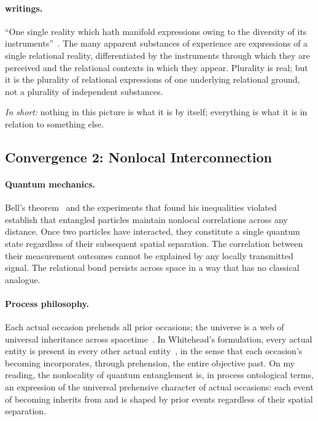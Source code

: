 \paragraph{\bahai writings.}
``One single reality which hath manifold expressions owing to the diversity of its
instruments''~\citep[para.~35]{SummonsLordHosts}.
The many apparent substances of experience are expressions of a single
relational reality, differentiated by the instruments through which they
are perceived and the relational contexts in which they appear.
Plurality is real; but it is the plurality of relational expressions of
one underlying relational ground, not a plurality of independent substances.

\emph{In short:} nothing in this picture is what it is by itself; everything
is what it is in relation to something else.

\subsection{Convergence 2: Nonlocal Interconnection}

\paragraph{Quantum mechanics.}
Bell's theorem~\citeyearpar{Bell1964} and the experiments that found his
inequalities violated~\citep{Aspect1982,Hensen2015} establish that entangled
particles maintain nonlocal correlations across any distance.
Once two particles have interacted, they constitute a single quantum state
regardless of their subsequent spatial separation.
The correlation between their measurement outcomes cannot be explained
by any locally transmitted signal.
The relational bond persists across space in a way that has no classical
analogue.

\paragraph{Process philosophy.}
Each actual occasion prehends all prior occasions; the universe is a web
of universal inheritance across spacetime~\citep{Whitehead1929}.
In Whitehead's formulation, every actual entity is present in every other
actual entity~\citep[pp.~79--80, Free Press 1978 ed.]{Whitehead1929}, in
the sense that each occasion's becoming incorporates, through prehension,
the entire objective past.
On my reading, the nonlocality of quantum entanglement is, in process
ontological terms, an expression of the universal prehensive character of
actual occasions: each event of becoming inherits from and is shaped by
prior events regardless of their spatial separation.

